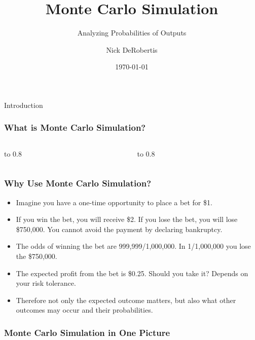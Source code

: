 \documentclass[handout, 11pt]{beamer}
\institute[UF]{\inst{1}
University of Florida\\
Department of Finance, Insurance, and Real Estate}
\begin{document}
\title[MC Sim]{Monte Carlo Simulation}
\subtitle{Analyzing Probabilities of Outputs}
\author[DeRobertis]{Nick DeRobertis}
\date{\today}
\begin{frame}
\titlepage
\label{title-frame}
\end{frame}
\begin{section}{Introduction}
\begin{frame}
\frametitle{What is Monte Carlo Simulation?}
\begin{columns}
\begin{column}{0.5\textwidth}
\vbox to 0.8
\end{column}
\begin{column}{0.5\textwidth}
\vbox to 0.8
\end{column}
\end{columns}
\end{frame}
\begin{frame}
\frametitle{Why Use Monte Carlo Simulation?}
\begin{itemize}
\item Imagine you have a one-time opportunity to place a bet for \$1. 
\vfill
\item If you win the bet, you will receive \$2. If you lose the bet, you will lose \$750,000. You cannot avoid the payment by declaring bankruptcy.
\vfill
\item The odds of winning the bet are 999,999/1,000,000. In 1/1,000,000 you lose the \$750,000.
\vfill
\item The expected profit from the bet is \$0.25. Should you take it? Depends on your risk tolerance.
\vfill
\item Therefore not only the expected outcome matters, but also what other outcomes may occur and their probabilities.
\end{itemize}
\end{frame}
\begin{frame}
\frametitle{Monte Carlo Simulation in One Picture}

\end{frame}
\end{section}
\end{document}

